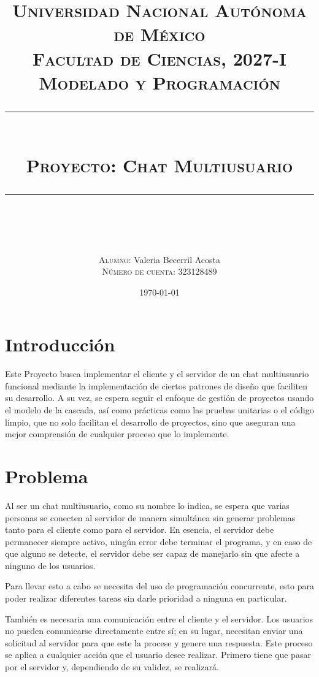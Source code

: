\documentclass[12pt]{article}  %
\title{
    \textsc{\Large Universidad Nacional Autónoma de México\\[0.2cm]
        {\normalsize Facultad de Ciencias, 2027-I}\\[0.2cm]
        {\normalsize Modelado y Programación}}\\[0.6cm]
    \rule{\linewidth}{0.4pt}\\[0.4cm]
    {\textsc{\Large {\color{maincolor}Proyecto:} Chat Multiusuario}}\\[0.1cm]
    \rule{\linewidth}{0.4pt}\\[1em]
}
\author{
    \textsc{Alumno:} Valeria Becerril Acosta\\[0.2cm]
    \textsc{Número de cuenta:} 323128489\\[0.4cm]
}
\date{\today\\[2.6cm]}
\begin{document}
\maketitle
\thispagestyle{empty}

\begin{abstract}


\end{abstract}

\newpage
\tableofcontents

\newpage
\section*{Introducción}

Este Proyecto busca implementar el cliente y el servidor de un chat multiusuario
funcional mediante la implementación de ciertos patrones de diseño que faciliten
su desarrollo. A su vez, se espera seguir el enfoque de gestión de proyectos
usando el modelo de la cascada, así como prácticas como las pruebas unitarias o
el código limpio, que no solo facilitan el desarrollo de proyectos, sino que
aseguran una mejor comprensión de cualquier proceso que lo implemente.

\section*{Problema}

Al ser un chat multiusuario, como su nombre lo indica, se espera que varias
personas se conecten al servidor de manera simultánea sin generar problemas
tanto para el cliente como para el servidor. En esencia, el servidor debe
permanecer siempre activo, ningún error debe terminar el programa, y en caso de
que alguno se detecte, el servidor debe ser capaz de manejarlo sin que afecte a
ninguno de los usuarios.

Para llevar esto a cabo se necesita del uso de programación concurrente, esto
para poder realizar diferentes tareas sin darle prioridad a ninguna en
particular.

También es necesaria una comunicación entre el cliente y el servidor. Los
usuarios no pueden comunicarse directamente entre sí; en su lugar, necesitan
enviar una solicitud al servidor para que este la procese y genere una
respuesta. Este proceso se aplica a cualquier acción que el usuario desee
realizar. Primero tiene que pasar por el servidor y, dependiendo de su validez,
se realizará.
\end{document}
